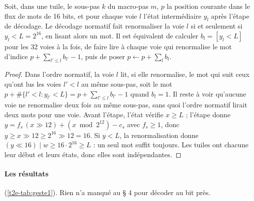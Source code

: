 \begin{lemme}\label{t2e-lem:vectorise}
Soit, dans une tuile, le sous-pas $k$ du macro-pas $m$, $p$ la position courante dans le flux de mots de 16 bits, et pour chaque voie $l$ l'état intermédiaire $y_l$ après l'étape de décodage. Le décodage normatif fait renormaliser la voie $l$ si et seulement si $y_l < L = 2^{16}$, en lisant alors un mot. Il est équivalent de calculer $b_l = [y_l < L]$ pour les 32 voies à la fois, de faire lire à chaque voie qui renormalise le mot d'indice $p + \sum_{l' \le l} b_{l'} - 1$, puis de poser $p \leftarrow p + \sum_l b_l$.
\end{lemme}
\begin{proof}
Dans l'ordre normatif, la voie $l$ lit, si elle renormalise, le mot qui suit ceux qu'ont lus les voies $l' < l$ au même sous-pas, soit le mot $p + \#\{l' < l : y_{l'} < L\} = p + \sum_{l' \le l} b_{l'} - 1$ quand $b_l = 1$. Il reste à voir qu'aucune voie ne renormalise deux fois au même sous-pas, sans quoi l'ordre normatif lirait deux mots pour une voie. Avant l'étape, l'état vérifie $x \ge L$ ; l'étape donne $y = f_s \,(x \gg 12) + (x \bmod 2^{12}) - c_s$ avec $f_s \ge 1$, donc $y \ge x \gg 12 \ge 2^{16} \gg 12 = 16$. Si $y < L$, la renormalisation donne $(y \ll 16) \mid w \ge 16 \cdot 2^{16} \ge L$ : un seul mot suffit toujours. Les tuiles ont chacune leur début et leurs états, donc elles sont indépendantes.
\end{proof}

\paragraph{Les résultats} (\cref{t2e-tab:geste1}). Rien n'a manqué au § 4 pour décoder au bit près.

